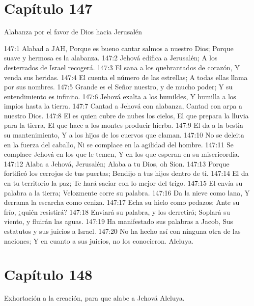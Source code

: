 \section*{Capítulo 147}
Alabanza por el favor de Dios hacia Jerusalén 
 
147:1 Alabad a JAH, 
Porque es bueno cantar salmos a nuestro Dios; 
Porque suave y hermosa es la alabanza. 
147:2 Jehová edifica a Jerusalén; 
A los desterrados de Israel recogerá. 
147:3 El sana a los quebrantados de corazón, 
Y venda sus heridas. 
147:4 El cuenta el número de las estrellas; 
A todas ellas llama por sus nombres. 
147:5 Grande es el Señor nuestro, y de mucho poder; 
Y su entendimiento es infinito. 
147:6 Jehová exalta a los humildes, 
Y humilla a los impíos hasta la tierra. 
147:7 Cantad a Jehová con alabanza, 
Cantad con arpa a nuestro Dios. 
147:8 El es quien cubre de nubes los cielos, 
El que prepara la lluvia para la tierra, 
El que hace a los montes producir hierba. 
147:9 El da a la bestia su mantenimiento, 
Y a los hijos de los cuervos que claman. 
147:10 No se deleita en la fuerza del caballo, 
Ni se complace en la agilidad del hombre. 
147:11 Se complace Jehová en los que le temen, 
Y en los que esperan en su misericordia. 
147:12 Alaba a Jehová, Jerusalén; 
Alaba a tu Dios, oh Sion. 
147:13 Porque fortificó los cerrojos de tus puertas; 
Bendijo a tus hijos dentro de ti. 
147:14 El da en tu territorio la paz; 
Te hará saciar con lo mejor del trigo. 
147:15 El envía su palabra a la tierra; 
Velozmente corre su palabra. 
147:16 Da la nieve como lana, 
Y derrama la escarcha como ceniza. 
147:17 Echa su hielo como pedazos; 
Ante su frío, ¿quién resistirá? 
147:18 Enviará su palabra, y los derretirá; 
Soplará su viento, y fluirán las aguas. 
147:19 Ha manifestado sus palabras a Jacob, 
Sus estatutos y sus juicios a Israel. 
147:20 No ha hecho así con ninguna otra de las naciones; 
Y en cuanto a sus juicios, no los conocieron. 
Aleluya. 
\section*{Capítulo 148}
Exhortación a la creación, para que alabe a Jehová 
Aleluya. 
 
